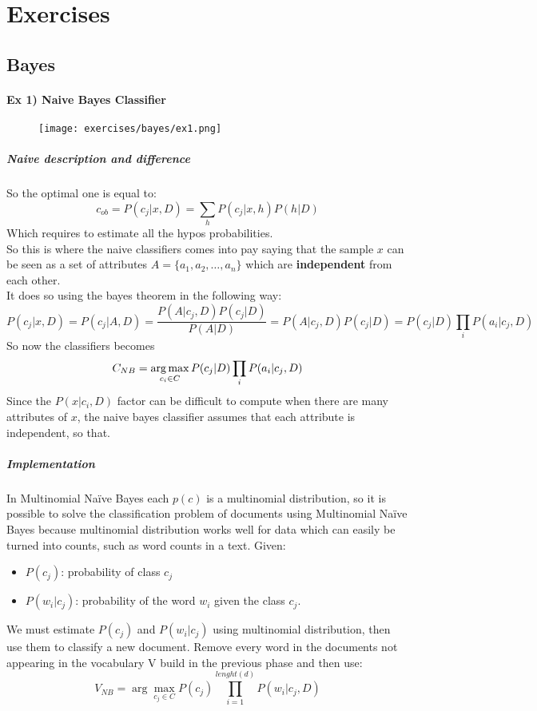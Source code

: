 
\newcommand{\argmaxs}[2]{\arg \max_{#2}{#1}}

\chapter{Exercises}

\section{Bayes}

\subsubsection{Ex 1) Naive Bayes Classifier}

\begin{figure}[H]
    \centering
   \texttt{[image: exercises/bayes/ex1.png]}
\end{figure}


\paragraph{Naive description and difference}
So the optimal one is equal to:
$$c_{ob}=P(c_j|x,D)=\sum_h P(c_j|x,h)P(h|D)$$
Which requires to estimate all the hypos probabilities.\\
So this is where the naive classifiers comes into pay saying that the sample $x$ can be seen as a set of attributes $A=\{a_1,a_2,\dots, a_n\}$ which are \textbf{independent} from each other.\\
It does so using the  bayes theorem in the following way:
$$P(c_j|x,D)=P(c_j|A,D)=\frac{P(A|c_j,D)P(c_j|D)}{P(A|D)}=P(A|c_j,D)P(c_j|D)=P(c_j|D)\prod_i P(a_i|c_j,D)$$
So now the classifiers becomes
$$C_{NB}=\operatorname*{arg\,max}_{c_i \in C}P(c_j|D)\prod_i P(a_i|c_j,D)$$
Since the $P(x| c_i,D)$ factor can be difficult to compute when there are many attributes of $x$, the naive bayes classifier assumes that each attribute is independent, so that.

\paragraph{Implementation }
In Multinomial Naïve Bayes each $p(c)$ is a multinomial distribution, so it is possible to solve the classification problem of documents using Multinomial Naïve Bayes because multinomial distribution works well for data which can easily be turned into counts, such as word counts in a text.
Given:
\begin{itemize}
\item $P(c_j)$: probability of class $c_j$
\item $P(w_i|c_j)$: probability of the word $w_i$ given the class $c_j$.
\end{itemize}
We must estimate $P(c_j)$ and $P(w_i|c_j)$ using multinomial distribution, then use them to classify a new document. Remove every word in the documents not appearing in the vocabulary V build in the previous phase and then use:
\[V_{NB}=\argmaxs{P(c_j)\prod_{i=1}^{lenght(d)}P(w_i|c_j,D)}{c_j \in C}\]


